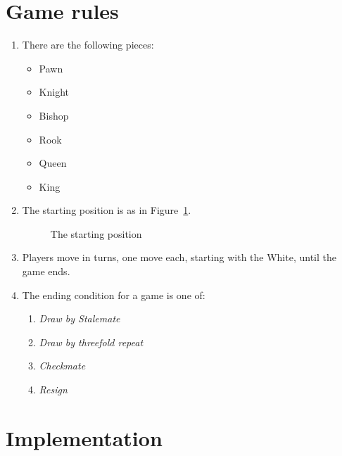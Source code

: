 \theoremstyle{remark}
\newtheorem{rem}{Remark}

\section{Game rules}

\begin{enumerate}
\item There are the following pieces:
  \begin{itemize}
  \item Pawn \pawn
  \item Knight \knight
  \item Bishop \bishop
  \item Rook \rook
  \item Queen \queen
  \item King \king
  \end{itemize}
\item The starting position is as in Figure~\ref{fig:reset}.
  \begin{figure}[!ht]
    \centering
    \newgame\showboard
    \caption{The starting position}
    \label{fig:reset}
  \end{figure}
\item Players move in turns, one move each, starting with the White,
  until the game ends.
\item The ending condition for a game is one of:
  \begin{enumerate}
  \item \emph{Draw by Stalemate}
  \item \emph{Draw by threefold repeat} 
  \item \emph{Checkmate}
  \item \emph{Resign}
  \end{enumerate}
\end{enumerate}

\clearpage \section{Implementation}

